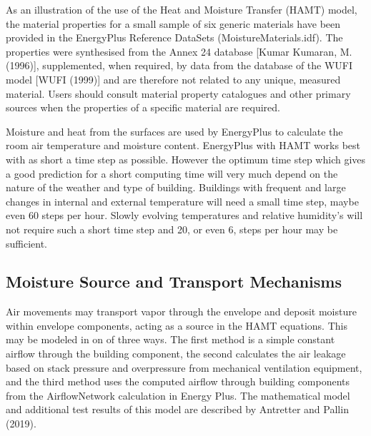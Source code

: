 As an illustration of the use of the Heat and Moisture Transfer (HAMT)
model, the material properties for a small sample of six generic materials
have been provided in the EnergyPlus Reference DataSets
(MoistureMaterials.idf). The properties were synthesised from the Annex 24
database {[}Kumar Kumaran, M. (1996){]}, supplemented, when required, by
data from the database of the WUFI model {[}WUFI (1999){]} and are
therefore not related to any unique, measured material. Users should
consult material property catalogues and other primary sources when the
properties of a specific material are required.

Moisture and heat from the surfaces are used by EnergyPlus to calculate the
room air temperature and moisture content. EnergyPlus with HAMT works best
with as short a time step as possible. However the optimum time step which
gives a good prediction for a short computing time will very much depend
on the nature of the weather and type of building. Buildings with frequent
and large changes in internal and external temperature will need a small
time step, maybe even 60 steps per hour. Slowly evolving temperatures and
relative humidity's will not require such a short time step and 20, or
even 6, steps per hour may be sufficient.

\subsection{Moisture Source and Transport Mechanisms}\label{hamt-moisture-sources}
Air movements may transport vapor through the envelope and deposit moisture
within envelope components, acting as a source in the HAMT equations. This
may be modeled in on of three ways. The first method is a simple constant
airflow through the building component, the second calculates the air leakage
based on stack pressure and overpressure from mechanical ventilation equipment,
and the third method uses the computed airflow through building components
from the AirflowNetwork calculation in Energy Plus. The mathematical model and
additional test results of this model are described by Antretter and Pallin (2019).

